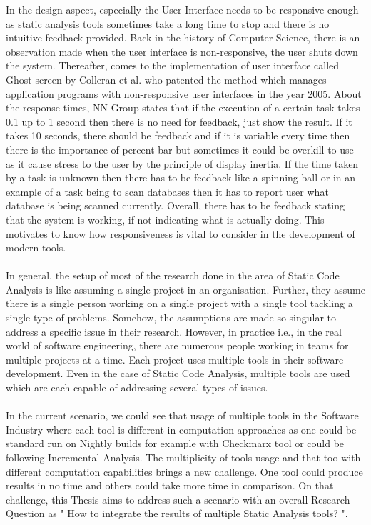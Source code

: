 In the design aspect, especially the User Interface needs to be responsive \cite{NB18} enough as static analysis tools sometimes take a long time to stop and there is no intuitive feedback provided. Back in the history of Computer Science, there is an observation made when the user interface is non-responsive, the user shuts down the system. Thereafter, comes to the implementation of user interface called Ghost screen by Colleran et al. \cite{colleran} who patented the method which manages application programs with non-responsive user interfaces in the year 2005. About the response times, NN Group \cite{nn} states that if the execution of a certain task takes 0.1 up to 1 second then there is no need for feedback, just show the result. If it takes 10 seconds, there should be feedback and if it is variable every time then there is the importance of percent bar \cite{Borman} but sometimes it could be overkill to use as it cause stress to the user by the principle of display inertia. If the time taken by a task is unknown then there has to be feedback like a spinning ball or in an example of a task being to scan databases then it has to report user what database is being scanned currently. Overall, there has to be feedback stating that the system is working, if not indicating what is actually doing. This motivates to know how responsiveness is vital to consider in the development of modern tools. \\ \\

In general, the setup of most of the research done in the area of Static Code Analysis is like assuming a single project in an organisation. Further, they assume there is a single person working on a single project with a single tool tackling a single type of problems.  Somehow, the assumptions are made so singular to address a specific issue in their research. However, in practice i.e., in the real world of software engineering, there are numerous people working in teams for multiple projects at a time. Each project uses multiple tools in their software development. Even in the case of Static Code Analysis, multiple tools are used which are each capable of addressing several types of issues. \\ \\

In the current scenario, we could see that usage of multiple tools in the Software Industry where each tool is different in computation approaches as one could be standard run on Nightly builds for example with Checkmarx \cite{checkmarx} tool or could be following Incremental Analysis. The multiplicity of tools usage and that too with different computation capabilities brings a new challenge.  One tool could produce results in no time and others could take more time in comparison. On that challenge, this Thesis aims to address such a scenario with an overall Research Question as " How to integrate the results of multiple Static Analysis tools? ". \\ \\

